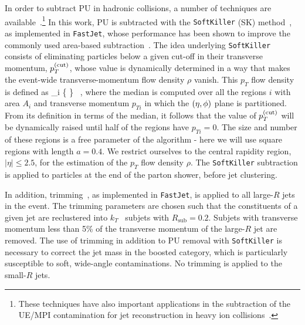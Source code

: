 %
In order to subtract PU in hadronic collisions, a number of techniques
are available~\cite{Cacciari:2009dp,TheATLAScollaboration:2013pia,Butterworth:2008iy,Cacciari:2007fd,Krohn:2009th,Krohn:2013lba,Ellis:2009me,Bertolini:2014bba,Cacciari:2014gra,Cacciari:2014jta,Berta:2014eza,Larkoski:2014wba}.\footnote{
These techniques have also important applications in the subtraction
of the UE/MPI contamination for jet reconstruction
in heavy ion collisions~\cite{Cacciari:2010te}.
}
%
In this work, PU  is subtracted
with the {\tt SoftKiller} (SK)
method~\cite{Cacciari:2014gra}, as implemented in {\tt FastJet},
whose performance has been shown to
improve the commonly used area-based subtraction~\cite{Cacciari:2009dp}.
%
The idea underlying {\tt SoftKiller} consists of eliminating particles
below a given cut-off in their transverse momentum, $p_T^{\rm (cut)}$, whose
value is dynamically determined in a way that makes the event-wide
transverse-momentum flow density $\rho$ vanish.
%
This $p_T$ flow density is defined as
\be
\rho{}_i \Bigg\{ \Bigg\} \, ,
\ee
where the median is computed over all the regions $i$ with area
$A_i$ and transverse momentum $p_{Ti}$ in which the $\left( \eta,\phi\right)$ plane
is partitioned.
%
From its definition in terms of the median,
it follows that the value of $p_T^{(\rm cut)}$
will be dynamically raised until half of the regions have
$p_{Ti}=0$.
%
The size and number of these regions is a free parameter of the algorithm -
here we will use square regions with length $a=0.4$.
%
We restrict ourselves to the central rapidity region,
$|\eta| \le 2.5$, for the estimation of the
$p_T$ flow density $\rho$.
%
The {\tt SoftKiller} subtraction is applied to particles at the end of the parton shower, before
jet clustering.

In addition, trimming~\cite{Krohn:2009th}, as implemented in {\tt FastJet}, is applied to all large-$R$ jets in the event.
%
The trimming parameters are chosen such that the constituents of a given jet are reclustered into $k_T$~\cite{Ellis:1993tq} 
subjets with $R_{\textrm{sub}} = 0.2$.
Subjets with transverse momentum less than 5\% of the transverse momentum of the large-$R$ jet are removed.
%
The use of trimming in addition to PU removal with {\tt SoftKiller} is necessary to correct the jet mass in the boosted category,
which is particularly susceptible
to soft, wide-angle contaminations.
%
No trimming is applied to the small-$R$ jets.

